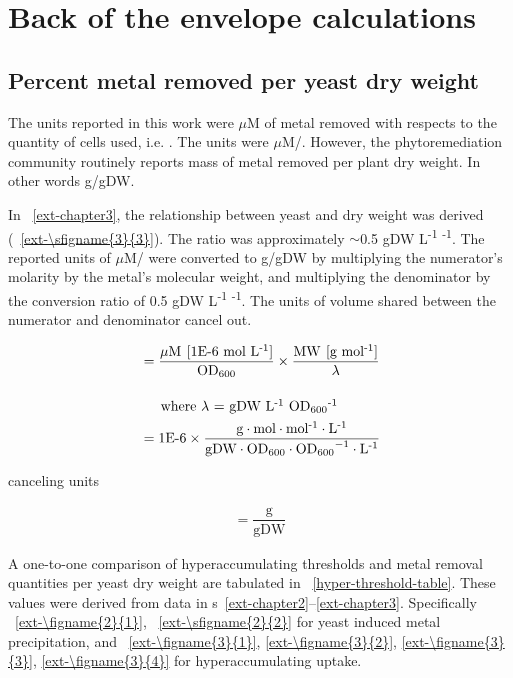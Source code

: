 \documentclass[../main/main]{subfiles}
\begin{document}
\chapter{Back of the envelope calculations}
\label{appendixB}

\section{Percent metal removed per yeast dry weight}
\label{section:B:dryweight}
The units reported in this work were $\mu$M of metal removed with respects to the quantity of cells used, i.e. \OD. The units were $\mu$M/\OD. However, the phytoremediation community routinely reports mass of metal removed per plant dry weight. In other words g/gDW.

In \CHAPTER~\ref{ext-chapter3}, the relationship between yeast \OD{} and dry weight was derived (\sFIGURE~\ref{ext-\sfigname{3}{3}}). The ratio was approximately $\sim$0.5 gDW L\textsuperscript{-1} \OD\textsuperscript{-1}. The reported units of $\mu$M/\OD{} were converted to g/gDW by multiplying the numerator's molarity by the metal's molecular weight, and multiplying the denominator \OD{} by the conversion ratio of 0.5 gDW L\textsuperscript{-1} \OD\textsuperscript{-1}. The units of volume shared between the numerator and denominator cancel out.

\begin{align}
  &=
  \dfrac{\mu\text{M}\:\left[ \text{1E-6 mol L\textsuperscript{-1}} \right]}{\text{OD}_{600}}
  \times
  \dfrac{\text{MW}\:\left[ \text{g mol\textsuperscript{-1}}\right]}{\lambda}
  \\[1em]
  \intertext{\indent where $\lambda$ = gDW L\textsuperscript{-1} \OD\textsuperscript{-1}}
  &=
  \text{1E-6}
  \times
  \dfrac{\text{g} \cdot \text{mol} \cdot \text{mol\textsuperscript{-1}} \cdot \text{L\textsuperscript{-1}}}
  {\text{gDW} \cdot\text{OD}_{600} \cdot{\text{OD}_{600}}^{-1} \cdot \text{L\textsuperscript{-1}}}
\end{align}

canceling units

\begin{align}
  = \dfrac{\text{g}}{\text{gDW}}
\end{align}

A one-to-one comparison of hyperaccumulating thresholds and metal removal quantities per yeast dry weight are tabulated in \TABLE~\ref{hyper-threshold-table}. These values were derived from data in \CHAPTER{}s~\ref{ext-chapter2}--\ref{ext-chapter3}.
Specifically \FIGURE~\ref{ext-\figname{2}{1}}, \FIGURE~\ref{ext-\sfigname{2}{2}} for yeast induced \HS{} metal precipitation, and
\FIGURE~\ref{ext-\figname{3}{1}}, \ref{ext-\figname{3}{2}}, \ref{ext-\figname{3}{3}}, \ref{ext-\figname{3}{4}} for hyperaccumulating uptake.
\end{document}
